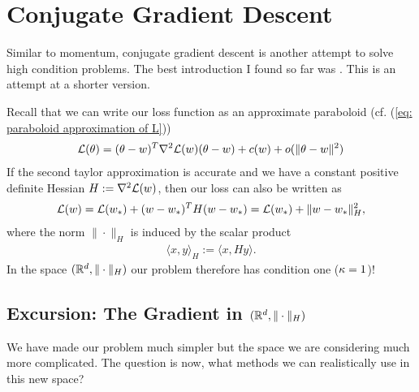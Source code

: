 \section{Conjugate Gradient Descent}\label{sec: conjugate gradient descent}

Similar to momentum, conjugate gradient descent is another attempt to solve
high condition problems. The best introduction I found so far was
\textcite{shewchukIntroductionConjugateGradient1994}. This is an attempt at a
shorter version. 

Recall that we can write
our loss function as an approximate paraboloid (cf. (\ref{eq: paraboloid
approximation of L}))
\begin{align*}
	\mathcal{L}(\theta)
	= (\theta-w)^T \nabla^2\mathcal{L}(w)(\theta-w)
	+ c(w) + o(\|\theta-w\|^2)
\end{align*}
If the second taylor approximation is accurate and we have a constant
positive definite Hessian \(H:=\nabla^2\mathcal{L}(w)\), then our loss can also
be written as
\begin{align*}
	\mathcal{L}(w) = \mathcal{L}(w_*) + 
	(w-w_*)^T H(w-w_*)
	= \mathcal{L}(w_*) + \|w-w_*\|_H^2,
\end{align*}
where the norm \(\|\cdot\|_H\) is induced by the scalar product
\begin{align*}
	\langle x, y \rangle_H := \langle x, Hy\rangle.
\end{align*}
In the space \((\mathbb{R}^d, \|\cdot\|_H)\) our problem therefore has condition one
(\(\kappa=1\))!

\subsection{Excursion: The Gradient in \((\mathbb{R}^d, \|\cdot\|_H)\)}

We have made our problem much simpler but the space we are considering much
more complicated. The question is now, what methods we can realistically use
in this new space?

